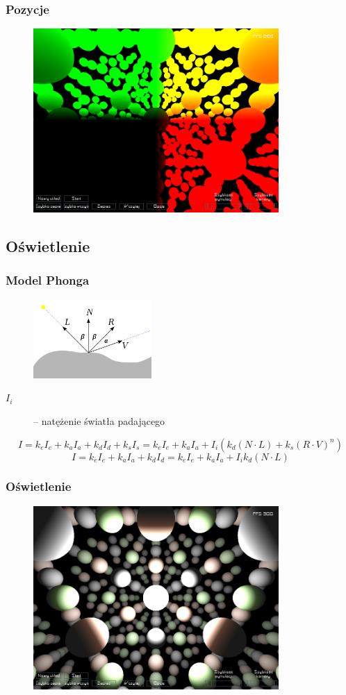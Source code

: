 \documentclass{beamer}
\begin{document}
\frame
{
	\frametitle{Pozycje}
	\begin{figure}
	\centering
		\includegraphics[height=7cm]{img/per3.png}
	\label{fig:per3}
	\end{figure}
	\setcounter{subfigure}{0}
}

\subsection{Oświetlenie}\label{sub:przebieg drugi}

\frame
{
	\frametitle{Model Phonga}

	\begin{figure}
	\centering
		\includegraphics[height=3cm]{img/phong.png}
	\label{fig:phong}
	\end{figure}
	\setcounter{subfigure}{0}
	\begin{description}
	\item[$I_i$] -- natężenie światła padającego
	\end{description}
	$$ I = k_e I_e + k_a I_a + k_d I_d + k_s I_s = k_e I_e + k_a I_a + I_i( k_d( N \cdot L ) + k_s ( R \cdot V )^n ) $$
	\pause $$ I = k_e I_e + k_a I_a + k_d I_d = k_e I_e + k_a I_a + I_i k_d( N \cdot L ) $$

}

\frame
{
	\frametitle{Oświetlenie}
	\begin{figure}
	\centering
		\includegraphics[height=7cm]{img/light0.png}
	\label{fig:per2}
	\end{figure}
	\setcounter{subfigure}{0}
}
\end{document}
